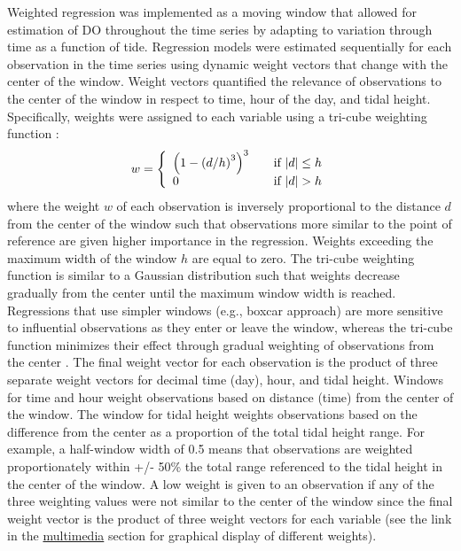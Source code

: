 \documentclass[letterpaper,12pt,oneside]{article}\usepackage[]{graphicx}\usepackage[]{color}
\begin{document}
Weighted regression was implemented as a moving window that allowed for estimation of \ac{DO} throughout the time series by adapting to variation through time as a function of tide. Regression models were estimated sequentially for each observation in the time series using dynamic weight vectors that change with the center of the window.  Weight vectors quantified the relevance of observations to the center of the window in respect to time, hour of the day, and tidal height.  Specifically, weights were assigned to each variable using a tri-cube weighting function \citep{Tukey77,Hirsch10}:
\begin{equation}
w= \left\{ 
  \begin{array}{l l}
    \left(1-\left(d/h\right)^3\right)^3 & \quad \textrm{if } |d| \leq h \\
    0 & \quad \textrm{if } |d| > h 
  \end{array} \right.
\end{equation}
where the weight $w$ of each observation is inversely proportional to the distance $d$ from the center of the window such that observations more similar to the point of reference are given higher importance in the regression.  Weights exceeding the maximum width of the window $h$ are equal to zero.  The tri-cube weighting function is similar to a Gaussian distribution such that weights decrease gradually from the center until the maximum window width is reached.  Regressions that use simpler windows (e.g., boxcar approach) are  more sensitive to influential observations as they enter or leave the window, whereas the tri-cube function minimizes their effect through gradual weighting of observations from the center \citep{Hirsch10}.  The final weight vector for each observation is the product of three separate weight vectors for decimal time (day), hour, and tidal height. Windows for time and hour weight observations based on distance (time) from the center of the window.  The window for tidal height weights observations based on the difference from the center as a proportion of the total tidal height range.  For example, a half-window width of 0.5 means that observations are weighted proportionately within +/- 50\% the total range referenced to the tidal height in the center of the window. A low weight is given to an observation if any of the three weighting values were not similar to the center of the window since the final weight vector is the product of three weight vectors for each variable (see the link in the \hyperref[multi]{multimedia} section for graphical display of different weights).    
\end{document}
